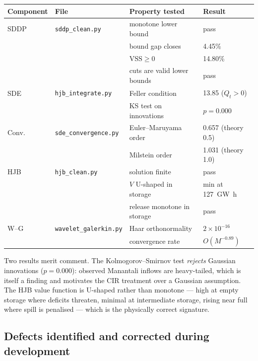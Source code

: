 \documentclass[12pt,a4paper]{article}
\begin{document}
\begin{center}
\begin{tabular}{llll}
\toprule
\textbf{Component} & \textbf{File} & \textbf{Property tested} & \textbf{Result} \\
\midrule
SDDP & \texttt{sddp\_clean.py} & monotone lower bound & pass \\
     &                          & bound gap closes & 4.45\% \\
     &                          & $\mathrm{VSS} \geq 0$ & 14.80\% \\
     &                          & cuts are valid lower bounds & pass \\
SDE  & \texttt{hjb\_integrate.py} & Feller condition & 13.85 ($Q_t>0$) \\
     &                          & KS test on innovations & $p=0.000$ \\
Conv.& \texttt{sde\_convergence.py} & Euler--Maruyama order & 0.657 (theory 0.5) \\
     &                          & Milstein order & 1.031 (theory 1.0) \\
HJB  & \texttt{hjb\_clean.py}  & solution finite & pass \\
     &                          & $V$ U-shaped in storage & min at \SI{127}{\giga\watt\hour} \\
     &                          & release monotone in storage & pass \\
W--G & \texttt{wavelet\_galerkin.py} & Haar orthonormality & $2\times10^{-16}$ \\
     &                          & convergence rate & $O(M^{-0.89})$ \\
\bottomrule
\end{tabular}
\end{center}

Two results merit comment. The Kolmogorov--Smirnov test \emph{rejects} Gaussian
innovations ($p=0.000$): observed Manantali inflows are heavy-tailed, which is
itself a finding and motivates the CIR treatment over a Gaussian assumption. The
HJB value function is U-shaped rather than monotone --- high at empty storage
where deficits threaten, minimal at intermediate storage, rising near full where
spill is penalised --- which is the physically correct signature.

\subsection{Defects identified and corrected during development}
\end{document}
